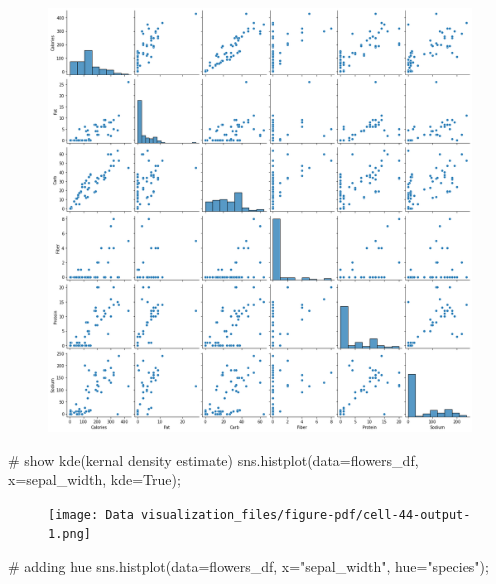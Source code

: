 \documentclass[
  letterpaper,
  DIV=11,
  numbers=noendperiod]{scrreprt}
\newenvironment{Shaded}{\begin{snugshade}}{\end{snugshade}}
\newcommand{\CommentTok}[1]{\textcolor[rgb]{0.37,0.37,0.37}{#1}}
\newcommand{\NormalTok}[1]{\textcolor[rgb]{0.00,0.23,0.31}{#1}}
\newcommand{\OperatorTok}[1]{\textcolor[rgb]{0.37,0.37,0.37}{#1}}
\newcommand{\StringTok}[1]{\textcolor[rgb]{0.13,0.47,0.30}{#1}}
\newcommand{\VariableTok}[1]{\textcolor[rgb]{0.07,0.07,0.07}{#1}}
\begin{document}
\begin{figure}[H]

{\centering \includegraphics{Data visualization_files/figure-pdf/cell-43-output-1.png}

}

\end{figure}

\begin{Shaded}
\begin{Highlighting}[]
\CommentTok{\# show kde(kernal density estimate)}
\NormalTok{sns.histplot(data}\OperatorTok{=}\NormalTok{flowers\_df, x}\OperatorTok{=}\StringTok{\textquotesingle{}sepal\_width\textquotesingle{}}\NormalTok{, kde}\OperatorTok{=}\VariableTok{True}\NormalTok{)}\OperatorTok{;}
\end{Highlighting}
\end{Shaded}

\begin{figure}[H]

{\centering \texttt{[image: Data visualization\_files/figure-pdf/cell-44-output-1.png]}

}

\end{figure}

\begin{Shaded}
\begin{Highlighting}[]
\CommentTok{\# adding hue}
\NormalTok{sns.histplot(data}\OperatorTok{=}\NormalTok{flowers\_df, x}\OperatorTok{=}\StringTok{"sepal\_width"}\NormalTok{, hue}\OperatorTok{=}\StringTok{"species"}\NormalTok{)}\OperatorTok{;}
\end{Highlighting}
\end{Shaded}
\end{document}
